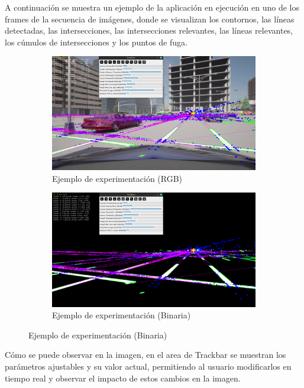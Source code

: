 A continuación se muestra un ejemplo de la aplicación en ejecución en uno de los frames de la secuencia de imágenes,
donde se visualizan los contornos, las líneas detectadas, las intersecciones, las intersecciones relevantes, las líneas relevantes,
los cúmulos de intersecciones y los puntos de fuga.

\begin{figure}[!ht]
    \begin{subfigure}{0.5\textwidth}
        \includegraphics[width=\textwidth]{img/reticule/experimentationRgb}
        \caption{Ejemplo de experimentación (RGB)}
        \label{fig:experimentationRgb}
    \end{subfigure}
    \begin{subfigure}{0.5\textwidth}
        \includegraphics[width=\textwidth]{img/reticule/experimentationBinary}
        \caption{Ejemplo de experimentación (Binaria)}
        \label{fig:experimentationBinary}
    \end{subfigure}
\end{figure}

Cómo se puede observar en la imagen, en el area de Trackbar se muestran los parámetros ajustables y su valor actual,
permitiendo al usuario modificarlos en tiempo real y observar el impacto de estos cambios en la imagen.
